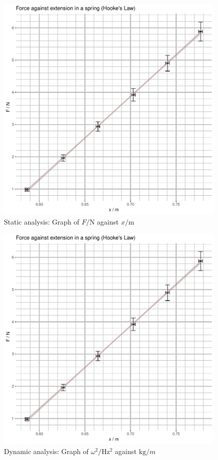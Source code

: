 \documentclass[a4paper,11pt]{article}
\begin{document}
\begin{figure}[H]
\includegraphics[width=\textwidth,page=1]{Rplots.pdf}
\caption{Static analysis: Graph of $F/\si{\newton}$ against $x/\si{\metre}$}
\label{fig:static}
\end{figure}

\begin{figure}[H]
\includegraphics[width=\textwidth,page=2]{Rplots.pdf}
\caption{Dynamic analysis: Graph of $\omega^2/\si{\hertz^2}$ against
         $\si{\kilogram}/m$}
\label{fig:dynamic}
\end{figure}
\end{document}
